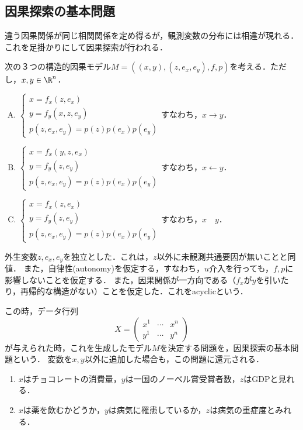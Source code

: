 \documentclass[uplatex,dvipdfmx]{jsreport}
\begin{document}
\subsection{因果探索の基本問題}

\begin{tcolorbox}[colframe=ForestGreen, colback=ForestGreen!10!white,breakable,colbacktitle=ForestGreen!40!white,coltitle=black,fonttitle=\bfseries\sffamily,
    title=]
        違う因果関係が同じ相関関係を定め得るが，観測変数の分布には相違が現れる．
        これを足掛かりにして因果探索が行われる．
\end{tcolorbox}

\begin{model}[因果探索の基本問題]
    次の３つの構造的因果モデル$M=((x,y),(z,e_x,e_y),f,p)$を考える．ただし，$x,y\in\R^n$．
    \begin{enumerate}[(A)]
        \item $\begin{cases}
            x=f_x(z,e_x)\\
            y=f_y(x,z,e_y)\\
            p(z,e_x,e_y)=p(z)p(e_x)p(e_y)
        \end{cases}$すなわち，$x\to y$．
        \item $\begin{cases}
            x=f_x(y,z,e_x)\\
            y=f_y(z,e_y)\\
            p(z,e_x,e_y)=p(z)p(e_x)p(e_y)
        \end{cases}$すなわち，$x\leftarrow y$．
        \item $\begin{cases}
            x=f_x(z,e_x)\\
            y=f_y(z,e_y)\\
            p(z,e_x,e_y)=p(z)p(e_x)p(e_y)
        \end{cases}$すなわち，$x\quad y$．
    \end{enumerate}
    外生変数$z,e_x,e_y$を独立とした．これは，$z$以外に未観測共通要因が無いことと同値．
    また，自律性(autonomy)を仮定する，すなわち，$u$介入を行っても，$f,p$に影響しないことを仮定する．
    また，因果関係が一方向である（$f_x$が$y$を引いたり，再帰的な構造がない）ことを仮定した．これをacyclicという．

    この時，データ行列
    \[X=\begin{pmatrix}x^1&\cdots&x^n\\y^1&\cdots&y^n\end{pmatrix}\]
    が与えられた時，これを生成したモデル$M$を決定する問題を，因果探索の基本問題という．
    変数を$x,y$以外に追加した場合も，この問題に還元される．
\end{model}
\begin{example}\mbox{}
    \begin{enumerate}
        \item $x$はチョコレートの消費量，$y$は一国のノーベル賞受賞者数，$z$はGDPと見れる．
        \item $x$は薬を飲むかどうか，$y$は病気に罹患しているか，$z$は病気の重症度とみれる．
    \end{enumerate}
\end{example}
\end{document}

